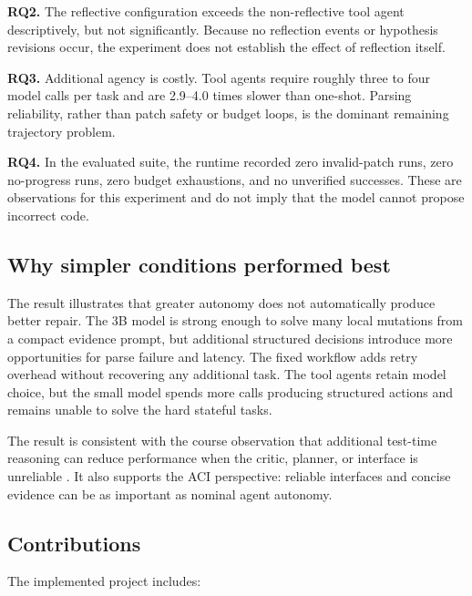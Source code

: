 \documentclass[11pt,a4paper]{article}
\begin{document}
\textbf{RQ2.} The reflective configuration exceeds the non-reflective tool
agent descriptively, but not significantly. Because no reflection events or
hypothesis revisions occur, the experiment does not establish the effect of
reflection itself.

\textbf{RQ3.} Additional agency is costly. Tool agents require roughly three to
four model calls per task and are 2.9--4.0 times slower than one-shot. Parsing
reliability, rather than patch safety or budget loops, is the dominant remaining
trajectory problem.

\textbf{RQ4.} In the evaluated suite, the runtime recorded zero invalid-patch runs, zero
no-progress runs, zero budget exhaustions, and no unverified successes. These
are observations for this experiment and do not imply that the model cannot
propose incorrect code.

\subsection{Why simpler conditions performed best}

The result illustrates that greater autonomy does not automatically produce
better repair. The 3B model is strong enough to solve many local mutations from a
compact evidence prompt, but additional structured decisions introduce more
opportunities for parse failure and latency. The fixed workflow adds retry
overhead without recovering any additional task. The tool agents retain model
choice, but the small model spends more calls producing structured actions and
remains unable to solve the hard stateful tasks.

The result is consistent with the course observation that additional test-time
reasoning can reduce performance when
the critic, planner, or interface is unreliable \cite{courseplanning}. It also
supports the ACI perspective: reliable interfaces and concise evidence can be as
important as nominal agent autonomy.

\subsection{Contributions}

The implemented project includes:
\end{document}
